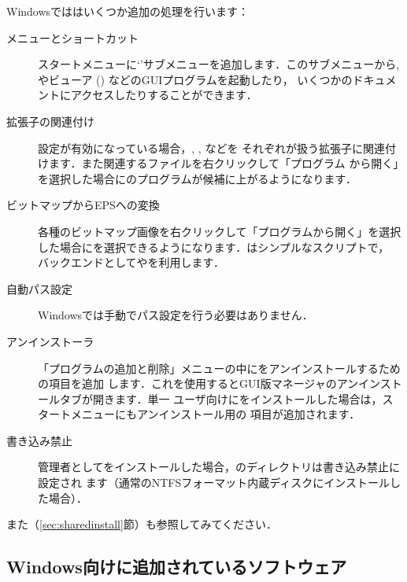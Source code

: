 \documentclass[uplatex,dvipdfmx,tombow]{jsarticle}
\begin{document}
Windowsでは\TL はいくつか追加の処理を行います：
%
\begin{description}
\item[メニューとショートカット]
スタートメニューに`\TL'サブメニューを追加します．このサブメニューから,
や\PS ビューア () などのGUIプログラムを起動したり，
いくつかのドキュメントにアクセスしたりすることができます．

\item[拡張子の関連付け]
設定が有効になっている場合，, , などを
それぞれが扱う拡張子に関連付けます．また関連するファイルを右クリックして「プログラム
から開く」を選択した場合に\TL のプログラムが候補に上がるようになります．

\item[ビットマップからEPSへの変換]
各種のビットマップ画像を右クリックして「プログラムから開く」を選択した場合にを選択できるようになります．はシンプルなスクリプトで，
バックエンドとしてやを利用します．

\item[自動パス設定]
Windowsでは手動でパス設定を行う必要はありません．

\item[アンインストーラ]
「プログラムの追加と削除」メニューの中に\TL をアンインストールするための項目を追加
します．これを使用するとGUI版\TL マネージャのアンインストールタブが開きます．単一
ユーザ向けに\TL をインストールした場合は，スタートメニューにもアンインストール用の
項目が追加されます．

\item[書き込み禁止]
管理者として\TL をインストールした場合，\TL のディレクトリは書き込み禁止に設定され
ます（通常のNTFSフォーマット内蔵ディスクにインストールした場合）．
\end{description}

また（\ref{sec:sharedinstall}節）も参照してみてください．

\subsection{Windows向けに追加されているソフトウェア}
\end{document}
